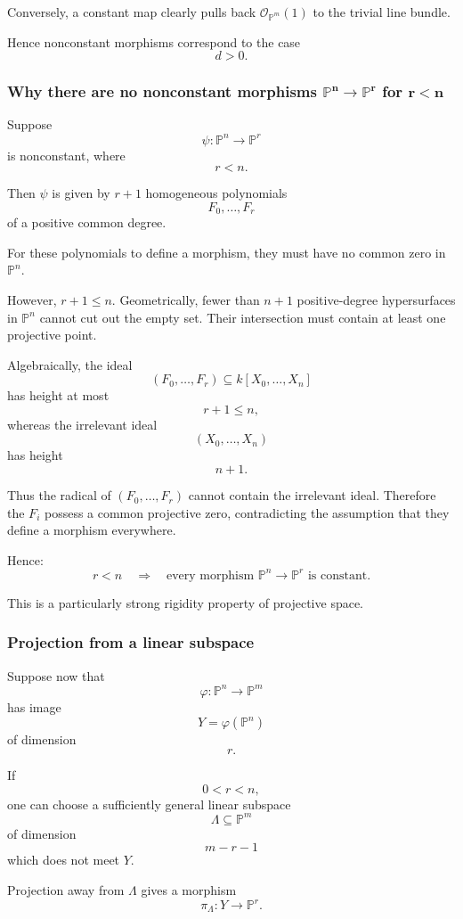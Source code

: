 \documentclass[12pt,a4paper]{article}
\newcommand{\OO}{\mathcal{O}}
\providecommand{\Pj}{\mathbb P}
\theoremstyle{notespace}
\begin{document}
Conversely, a constant map clearly pulls back \(\OO_{\Pj^m}(1)\) to the trivial line bundle.

Hence nonconstant morphisms correspond to the case
\[
d>0.
\]

\subsubsection{Why there are no nonconstant morphisms \(\boldsymbol{\Pj^n\to\Pj^r}\) for \(\boldsymbol{r<n}\)}

Suppose
\[
\psi:\Pj^n\longrightarrow\Pj^r
\]
is nonconstant, where
\[
r<n.
\]

Then \(\psi\) is given by \(r+1\) homogeneous polynomials
\[
F_0,\dots,F_r
\]
of a positive common degree.

For these polynomials to define a morphism, they must have no common zero in \(\Pj^n\).

However, \(r+1\leq n\). Geometrically, fewer than \(n+1\) positive-degree hypersurfaces in \(\Pj^n\) cannot cut out the empty set. Their intersection must contain at least one projective point.

Algebraically, the ideal
\[
(F_0,\dots,F_r)
\subseteq
k[X_0,\dots,X_n]
\]
has height at most
\[
r+1\leq n,
\]
whereas the irrelevant ideal
\[
(X_0,\dots,X_n)
\]
has height
\[
n+1.
\]

Thus the radical of \((F_0,\dots,F_r)\) cannot contain the irrelevant ideal. Therefore the \(F_i\) possess a common projective zero, contradicting the assumption that they define a morphism everywhere.

Hence:
\[
\boxed{
	r<n
	\quad\Longrightarrow\quad
	\text{every morphism }\Pj^n\longrightarrow\Pj^r
	\text{ is constant.}
}
\]

This is a particularly strong rigidity property of projective space.

\subsubsection{Projection from a linear subspace}

Suppose now that
\[
\varphi:\Pj^n\longrightarrow\Pj^m
\]
has image
\[
Y=\varphi(\Pj^n)
\]
of dimension
\[
r.
\]

If
\[
0<r<n,
\]
one can choose a sufficiently general linear subspace
\[
\Lambda\subseteq\Pj^m
\]
of dimension
\[
m-r-1
\]
which does not meet \(Y\).

Projection away from \(\Lambda\) gives a morphism
\[
\pi_{\Lambda}:Y\longrightarrow\Pj^r.
\]
\end{document}

